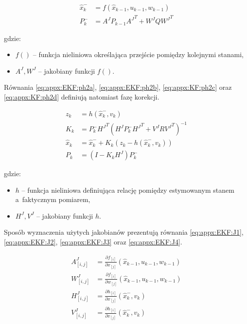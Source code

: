 \begin{subequations}
	\begin{align}
		\widehat{x}^-_k & = f(\widehat{x}_{k-1}, u_{k-1}, w_{k-1})\label{eq:appx:EKF:ph1a} \\
		P^-_k           & = A^J P_{k-1} {A^J}^T + W^J Q {W^J}^T \label{eq:appx:EKF:ph1b}   
	\end{align}
\end{subequations}

gdzie:
\begin{itemize}
	\item $f()$ -- funkcja nieliniowa określająca przejście pomiędzy kolejnymi stanami,
	\item $A^J , W^J$ -- jakobiany funkcji $f()$.
\end{itemize}

Równania \ref{eq:appx:EKF:ph2a}, \ref{eq:appx:EKF:ph2b}, \ref{eq:appx:KF:ph2c} oraz \ref{eq:appx:KF:ph2d} definiują natomiast fazę korekcji.

\begin{subequations}
	\begin{align}
		z_k           & = h(\widehat{x}^-_k, v_k) \label{eq:appx:EKF:ph2a}                                 \\
		K_k           & = P^-_{k}{H^J}^T(H^J P^-_{k}{H^J}^T + V^J R {V^J}^T)^{-1} \label{eq:appx:EKF:ph2b} \\
		\widehat{x}_k & = \widehat{x}^-_k + K_{k}(z_k-h(\widehat{x}^-_k, v_k))  \label{eq:appx:EKF:ph2c}   \\
		P_k           & = (I-K_{k}H^J)P^-_k \label{eq:appx:EKF:ph2d}                                       
	\end{align}
\end{subequations}

gdzie:
\begin{itemize}
	\item $h$ -- funkcja nieliniowa definiująca relację pomiędzy estymowanym stanem a~faktycznym pomiarem,
	\item $H^J, V^J$ -- jakobiany funkcji $h$.
\end{itemize}

Sposób wyznaczenia użytych jakobianów prezentują równania \ref{eq:appx:EKF:J1}, \ref{eq:appx:EKF:J2}, \ref{eq:appx:EKF:J3} oraz \ref{eq:appx:EKF:J4}.

\begin{subequations}
	\begin{align}
		A^J_{[i, j]} & = \frac{\partial f_{[i]}}{\partial x_{[j]}}(\widehat{x}_{k-1}, u_{k-1}, w_{k-1}) \label{eq:appx:EKF:J1} \\
		W^J_{[i, j]} & = \frac{\partial f_{[i]}}{\partial w_{[j]}}(\widehat{x}_{k-1}, u_{k-1}, w_{k-1}) \label{eq:appx:EKF:J2} \\
		H^J_{[i, j]} & = \frac{\partial h_{[i]}}{\partial x_{[j]}}(\widehat{x}^-_k, v_k) \label{eq:appx:EKF:J3}                \\
		V^J_{[i, j]} & = \frac{\partial h_{[i]}}{\partial v_{[j]}}(\widehat{x}^-_k, v_k) \label{eq:appx:EKF:J4}                
	\end{align}
\end{subequations}

